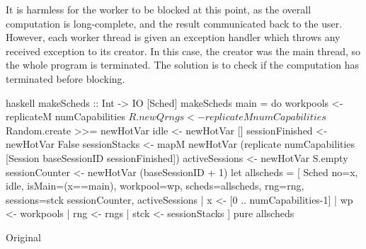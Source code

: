 It is harmless for the worker to be blocked at this point, as the
overall computation is long-complete, and the result communicated back
to the user.  However, each worker thread is given an exception
handler which throws any received exception to its creator.  In this
case, the creator was the main thread, so the whole program is
terminated.  The solution is to check if the computation has
terminated before blocking.

\begin{listing}
  \begin{sublisting}{\textwidth}
    \centering
    \begin{cminted}{haskell}
makeScheds :: Int -> IO [Sched]
makeScheds main = do
   workpools <- replicateM numCapabilities $ R.newQ
   rngs <- replicateM numCapabilities $ Random.create >>= newHotVar
   idle <- newHotVar []
   sessionFinished <- newHotVar False
   sessionStacks   <- mapM newHotVar
     (replicate numCapabilities [Session baseSessionID sessionFinished])
   activeSessions  <- newHotVar S.empty
   sessionCounter  <- newHotVar (baseSessionID + 1)
   let allscheds = [ Sched { no=x, idle, isMain=(x==main), workpool=wp,
                             scheds=allscheds, rng=rng, sessions=stck
                             sessionCounter, activeSessions
                           }
                   | x   <- [0 .. numCapabilities-1]
                   | wp  <- workpools
                   | rng <- rngs
                   | stck <- sessionStacks
                   ]
   pure allscheds
    \end{cminted}
    \caption{Original}\label{lst:parmonad_orig}
  \end{sublisting}

  \vspace{1.5em}


\end{listing}
